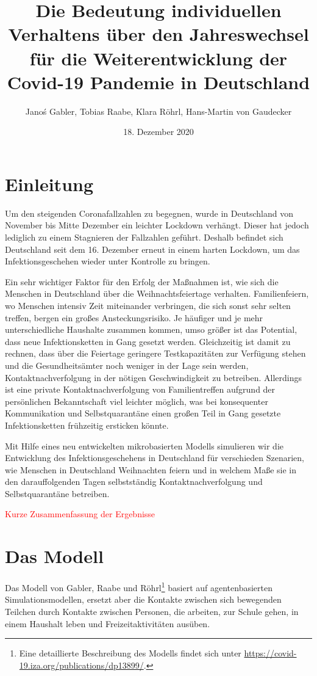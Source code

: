 \documentclass[a4paper,11pt,leqno,fleqn]{article}
\title{Die Bedeutung individuellen Verhaltens über den Jahreswechsel für die Weiterentwicklung der Covid-19 Pandemie in Deutschland}
\date{18. Dezember 2020}
\author{Janoś Gabler, Tobias Raabe, Klara Röhrl, Hans-Martin von Gaudecker}
\begin{document}
\maketitle
{}
\setcounter{page}{1}


\section{Einleitung}

Um den steigenden Coronafallzahlen zu begegnen, wurde in Deutschland von November bis Mitte Dezember ein leichter Lockdown verhängt.
Dieser hat jedoch lediglich zu einem Stagnieren der Fallzahlen geführt.
Deshalb befindet sich Deutschland seit dem 16. Dezember erneut in einem harten Lockdown, um das Infektionsgeschehen wieder unter Kontrolle zu bringen.

Ein sehr wichtiger Faktor für den Erfolg der Maßnahmen ist, wie sich die Menschen in Deutschland über die Weihnachtsfeiertage verhalten.
Familienfeiern, wo Menschen intensiv Zeit miteinander verbringen, die sich sonst sehr selten treffen, bergen ein großes Ansteckungsrisiko.
Je häufiger und je mehr unterschiedliche Haushalte zusammen kommen, umso größer ist das Potential, dass neue Infektionsketten in Gang gesetzt werden.
Gleichzeitig ist damit zu rechnen, dass über die Feiertage geringere Testkapazitäten zur Verfügung stehen und die Gesundheitsämter noch weniger in der Lage sein werden, Kontaktnachverfolgung in der nötigen Geschwindigkeit zu betreiben.
Allerdings ist eine private Kontaktnachverfolgung von Familientreffen aufgrund der persönlichen Bekanntschaft viel leichter möglich, was bei konsequenter Kommunikation und Selbstquarantäne einen großen Teil in Gang gesetzte Infektionsketten frühzeitig ersticken könnte.

Mit Hilfe eines neu entwickelten mikrobasierten Modells simulieren wir die Entwicklung des Infektionsgeschehens in Deutschland für verschieden Szenarien, wie Menschen in Deutschland Weihnachten feiern und in welchem Maße sie in den darauffolgenden Tagen selbstständig Kontaktnachverfolgung und Selbstquarantäne betreiben.

\textcolor{red}{Kurze Zusammenfassung der Ergebnisse}

\section{Das Modell}

Das Modell von Gabler, Raabe und Röhrl\footnote{Eine detaillierte Beschreibung des Modells findet sich unter \url{https://covid-19.iza.org/publications/dp13899/}.} basiert auf agentenbasierten Simulationsmodellen, ersetzt aber die Kontakte zwischen sich bewegenden Teilchen durch Kontakte zwischen Personen, die arbeiten, zur Schule gehen, in einem Haushalt leben und Freizeitaktivitäten ausüben.
\end{document}
